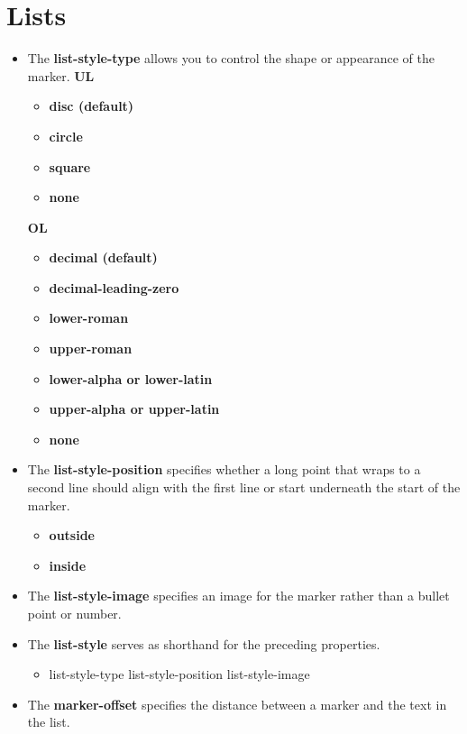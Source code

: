 \documentclass{report}
\begin{document}
    \pagebreak \bigbreak \noindent 
    \section{\LARGE Lists}
    \bigbreak \noindent 
    \begin{itemize}
        \item The \textbf{list-style-type} allows you to control the shape or appearance of the marker.
            \bigbreak \noindent 
            \textbf{UL}
            \begin{itemize}
                \item \textbf{disc (default)}
                \item \textbf{circle}
                \item \textbf{square}
                \item \textbf{none}
            \end{itemize}
            \bigbreak \noindent 
            \textbf{OL}
            \begin{itemize}
                \item \textbf{decimal (default)}
                \item \textbf{decimal-leading-zero}
                \item \textbf{lower-roman}
                \item \textbf{upper-roman}
                \item \textbf{lower-alpha or lower-latin}
                \item \textbf{upper-alpha or upper-latin}
                \item \textbf{none}
            \end{itemize}
        \item The \textbf{list-style-position} specifies whether a long point that wraps to a second line should align with the first line or start underneath the start of the marker.
            \begin{itemize}
                \item \textbf{outside}
                \item \textbf{inside}
            \end{itemize}
        \item The \textbf{list-style-image} specifies an image for the marker rather than a bullet point or number.
        \item The \textbf{list-style} serves as shorthand for the preceding properties.
            \begin{itemize}
                \item list-style-type list-style-position list-style-image 
            \end{itemize}
        \item The \textbf{marker-offset} specifies the distance between a marker and the text in the list.
    \end{itemize}
\end{document}
